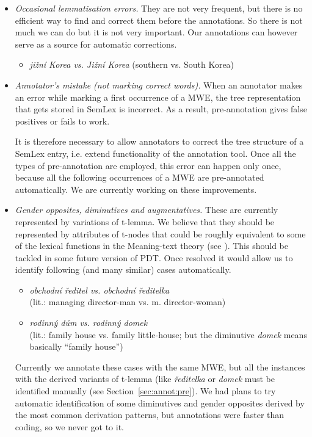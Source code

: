 \begin{itemize}
%
\item \emph{Occasional lemmatisation errors.} They are not very frequent, but there is no efficient way to find and correct them before the annotations. So there is not much we can do but it is not very important. Our annotations can however serve as a source for automatic corrections.
	\begin{itemize}
	\item \textit{jižní Korea {\rm vs.} Jižní Korea} (southern vs. South Korea)
	\end{itemize}
\item \emph{Annotator's mistake (not marking correct words).} When an annotator makes an error while marking a first occurrence of a MWE, the tree representation that gets stored in SemLex is incorrect. As a result, pre-annotation gives false positives or fails to work. 

It is therefore necessary to allow annotators to correct the tree structure of a SemLex entry, i.e. extend functionality of the annotation tool. Once all the types of pre-annotation are employed, this error can happen only once, because all the following occurrences of a MWE are pre-annotated automatically. We are currently working on these improvements.
%
\item \emph{Gender opposites, diminutives and augmentatives.} These are currently represented by variations of t-lemma. 
We believe that they should be represented by attributes of t-nodes %
that could be roughly equivalent to some of the lexical functions in the Meaning-text theory (see \cite{melcuk:1992}).
This should be tackled in some future version of PDT. Once resolved it would allow us to identify following (and many similar) cases automatically. 
	\begin{itemize}
	\item \textit{obchodní ředitel {\rm vs.} obchodní ředitelka} \\(lit.: managing director-man vs. m. director-woman)
	\item \textit{rodinný dům {\rm vs.} rodinný domek} \\(lit.: family house vs. family little-house; but the diminutive \emph{domek} means basically “family house”)
	\end{itemize}
%
Currently we annotate these cases with the same MWE, but all the instances with the derived variants of t-lemma (like \emph{ředitelka } or \emph{domek} must be identified manually (see Section~\ref{sec:annot:pre}). We had plans to try automatic identification of some diminutives and gender opposites derived by the most common derivation patterns, but annotations were faster than coding, so we never got to it.


\end{itemize}
